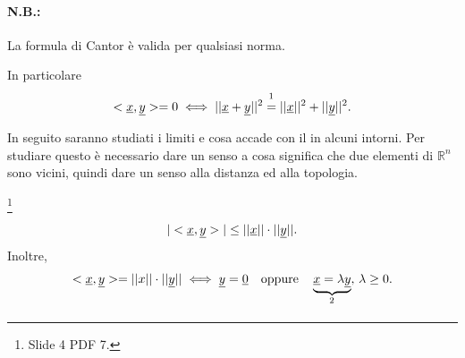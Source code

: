 \addtocounter{footnote}{-1}


\paragraph{N.B.:} La formula di Cantor è valida per qualsiasi norma.

\begin{remark}
    In particolare
    \begin{equation*}
        <\uline x, \uline y> =0 \iff ||\uline x+\uline y||^2 \overset{\footnotemark}{=}||\uline x||^2+||\uline y||^2.
    \end{equation*}
\end{remark}

In seguito saranno studiati i limiti e cosa accade con il in alcuni intorni. Per studiare questo è necessario dare un senso a cosa significa che due elementi di $\mathbb R^n$ sono vicini, quindi dare un senso alla distanza ed alla topologia.

\begin{property}\label{propo:disuguaglianza_cauchy_schwarz}
\footnote{Slide 4 PDF 7.}
    \begin{equation}\label{eq:disuguaglianza_cauchy_schwarz}
        |<\uline x,\uline y>|\leq||\uline x||\cdot||\uline y||.
    \end{equation}
    Inoltre,
    \begin{equation*}
            <\uline x, \uline y>=||x||\cdot||\uline y|| \iff \uline y=\uline 0\quad\text{oppure}\quad \underbrace{\uline x=\lambda \uline y}_{\footnotemark},\, \lambda\geq 0.
    \end{equation*}
\end{property}

